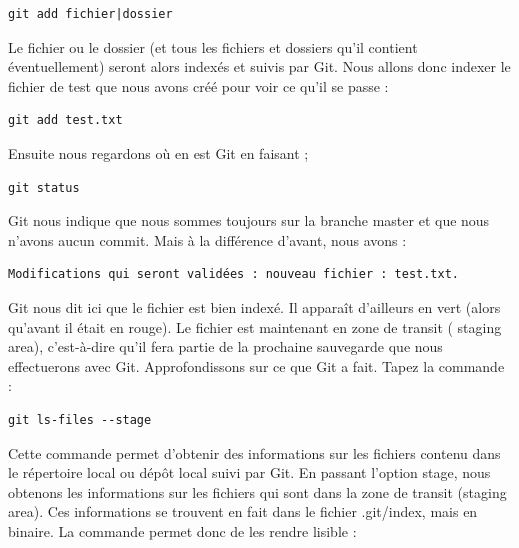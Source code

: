 \documentclass{article}
\begin{document}
\begin{verbatim}
git add fichier|dossier
\end{verbatim}

Le fichier ou le dossier (et tous les fichiers et dossiers qu'il contient éventuellement) seront alors indexés et suivis par {\color{blue} Git}. Nous allons donc indexer le fichier de test que nous avons créé pour voir ce qu'il se passe :

\begin{verbatim}
git add test.txt
\end{verbatim}

Ensuite nous regardons où en est {\color{blue} Git} en faisant ;

\begin{verbatim}
git status
\end{verbatim}

{\color{blue} Git} nous indique que nous sommes toujours sur la branche master et que nous n'avons aucun commit. Mais à la différence d'avant, nous avons :

\begin{verbatim}
Modifications qui seront validées : nouveau fichier : test.txt.
\end{verbatim}

{\color{blue} Git} nous dit ici que le fichier est bien indexé. Il apparaît d'ailleurs en vert (alors qu'avant il était en rouge). Le fichier est maintenant en zone de transit ({\color{blue} staging area}), c'est-à-dire qu'il fera partie de la prochaine sauvegarde que nous effectuerons avec {\color{blue} Git}. Approfondissons sur ce que {\color{blue} Git} a fait. Tapez la commande :

\begin{verbatim}
git ls-files --stage
\end{verbatim}

Cette commande permet d'obtenir des informations sur les fichiers contenu dans le répertoire local ou dépôt local suivi par {\color{blue} Git}. En passant l'option stage, nous obtenons les informations sur les fichiers qui sont dans la zone de transit (staging area). Ces informations se trouvent en fait dans le fichier .git/index, mais en binaire. La commande permet donc de les rendre lisible :
\end{document}
